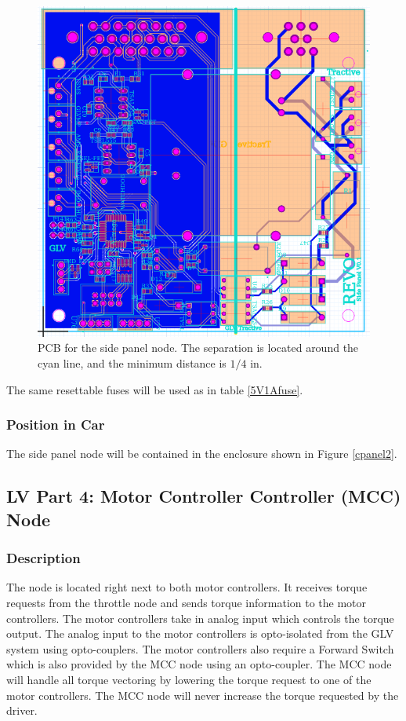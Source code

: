 \documentclass{article}
\begin{document}
            \begin{figure}[H]
            \centering
            \includegraphics[width = 0.8 \textwidth]{panelPCB}
            \caption{PCB for the side panel node. The separation is located around the cyan line, and the minimum distance is $1/4$ in.}
            \label{panelPCB}
            \end{figure}

            The same resettable fuses will be used as in table \ref{5V1Afuse}.

        \subsubsection{Position in Car}

            The side panel node will be contained in the enclosure shown in Figure \ref{cpanel2}.

    \subsection{LV Part 4: Motor Controller Controller (MCC) Node}

        \subsubsection{Description}
            The node is located right next to both motor controllers. It receives torque requests from the throttle node and sends torque information to the motor controllers. The motor controllers take in analog input which controls the torque output. The analog input to the motor controllers is opto-isolated from the GLV system using opto-couplers. The motor controllers also require a Forward Switch which is also provided by the MCC node using an opto-coupler.
            The MCC node will handle all torque vectoring by lowering the torque request to one of the motor controllers. The MCC node will never increase the torque requested by the driver.\\
\end{document}
